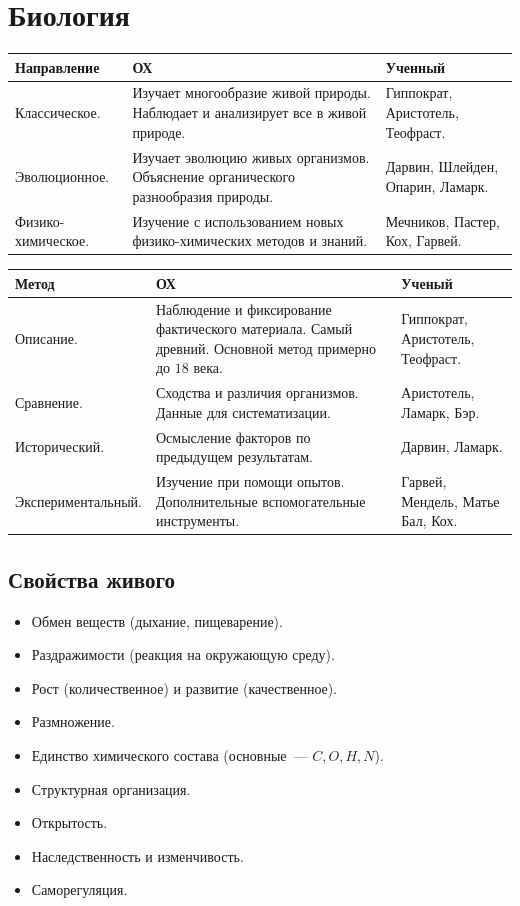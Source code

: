 \documentclass[12pt]{article}
\begin{document}
	\tableofcontents
	\setcounter{tocdepth}{3}
	\newpage
	\section{Биология}
	\begin{xltabular}{\textwidth}{|m{3cm}|X|m{3cm}|}
		\hline
		Направление & ОХ & Ученный\\
		\hline
		Классическое. & Изучает многообразие живой природы. Наблюдает и анализирует все в живой природе. & Гиппократ, Аристотель, Теофраст.\\
		\hline
		Эволюционное. & Изучает эволюцию живых организмов. Объяснение органического разнообразия природы. & Дарвин, Шлейден, Опарин, Ламарк.\\
		\hline
		Физико-химическое. & Изучение с использованием новых физико-химических методов и знаний. & Мечников, Пастер, Кох, Гарвей.\\
		\hline
	\end{xltabular}
	\begin{xltabular}{\textwidth}{|m{3.8cm}|X|m{3cm}|}
		\hline
		Метод & ОХ & Ученый\\
		\hline
		Описание. & Наблюдение и фиксирование фактического материала. Самый древний. Основной метод примерно до $18$ века. & Гиппократ, Аристотель, Теофраст.\\
		\hline
		Сравнение. & Сходства и различия организмов. Данные для систематизации. & Аристотель, Ламарк, Бэр.\\
		\hline
		Исторический. & Осмысление факторов по предыдущем результатам. & Дарвин, Ламарк.\\
		\hline
		Экспериментальный. & Изучение при помощи опытов. Дополнительные вспомогательные инструменты. & Гарвей, Мендель, Матье Бал, Кох.\\
		\hline
	\end{xltabular}
	\subsection{Свойства живого}
	\begin{itemize}
		\item Обмен веществ (дыхание, пищеварение).
		\item Раздражимости (реакция на окружающую среду).
		\item Рост (количественное) и развитие (качественное).
		\item Размножение.
		\item Единство химического состава (основные~--- $C, O, H, N$).
		\item Структурная организация.
		\item Открытость.
		\item Наследственность и изменчивость.
		\item Саморегуляция.
	\end{itemize}
\end{document}
